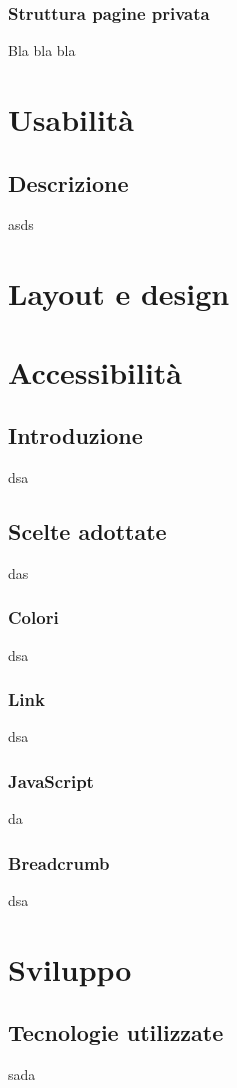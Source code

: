 \documentclass[12pt]{article}
\begin{document}
	\subsubsection{Struttura pagine privata}
	Bla bla bla

	\section{Usabilità}
	\label{Usabilità}
	\subsection{Descrizione}
	asds
	\section{Layout e design}

	\section{Accessibilità}
	\subsection{Introduzione}
	dsa
	\subsection{Scelte adottate}
	das
	\subsubsection{Colori}
	dsa
	\subsubsection{Link}
	dsa
	\subsubsection{JavaScript}
	da
	\subsubsection{Breadcrumb}
	dsa
	

	\section{Sviluppo}
	\subsection{Tecnologie utilizzate}
	sada
\end{document}
